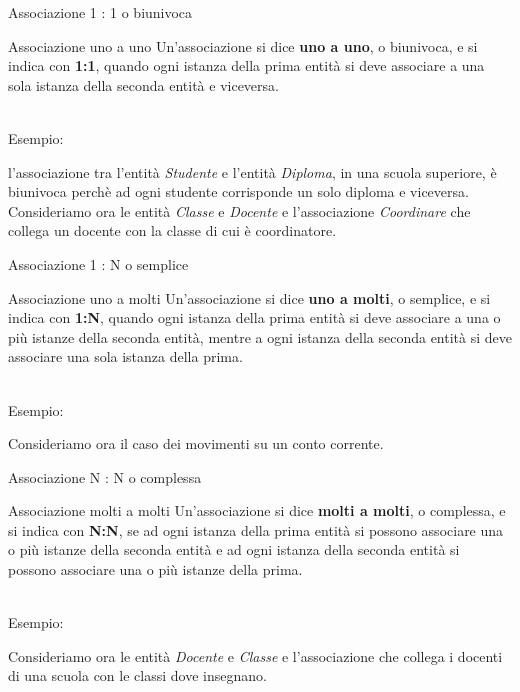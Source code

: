 %
\begin{frame}{Associazione 1 : 1 o biunivoca}
\begin{minipage}{0.9\textwidth}
\begin{block}{Associazione uno a uno}
Un'associazione si dice \textbf{uno a uno}, o biunivoca, e si indica con \textbf{1:1}, quando ogni istanza della prima entit\`a si deve associare a una sola istanza della seconda entit\`a e viceversa.
\end{block}
\end{minipage}
\pause
\newline
\\Esempio:

l'associazione tra l'entit\`a \textit{Studente} e l'entit\`a \textit{Diploma}, in una scuola superiore, \`e biunivoca perch\`e ad ogni studente corrisponde un solo diploma e viceversa.
\newline
\\ Consideriamo ora le entit\`a \textit{Classe} e \textit{Docente} e l'associazione \textit{Coordinare} che collega un docente con la classe di cui \`e coordinatore.
\end{frame}
%
\begin{frame}{Associazione 1 : N o semplice}
\begin{minipage}{0.9\textwidth}
\begin{block}{Associazione uno a molti}
Un'associazione si dice \textbf{uno a molti}, o semplice, e si indica con \textbf{1:N}, quando ogni istanza della prima entit\`a si deve associare a una o pi\`u istanze della seconda entit\`a, mentre a ogni istanza della seconda entit\`a si deve associare una sola istanza della prima.
\end{block}
\end{minipage}
\pause
\newline
\\Esempio:

Consideriamo ora il caso dei movimenti su un conto corrente.
\end{frame}
%
\begin{frame}{Associazione N : N o complessa}
\begin{minipage}{0.9\textwidth}
\begin{block}{Associazione molti a molti}
Un'associazione si dice \textbf{molti a molti}, o complessa, e si indica con \textbf{N:N}, se ad ogni istanza della prima entit\`a si possono associare una o pi\`u istanze della seconda entit\`a e ad ogni istanza della seconda entit\`a si possono associare una o pi\`u istanze della prima.
\end{block}
\end{minipage}
\pause
\newline
\\Esempio:

Consideriamo ora le entit\`a \textit{Docente} e \textit{Classe} e l'associazione che collega i docenti di una scuola con le classi dove insegnano.
\end{frame}
